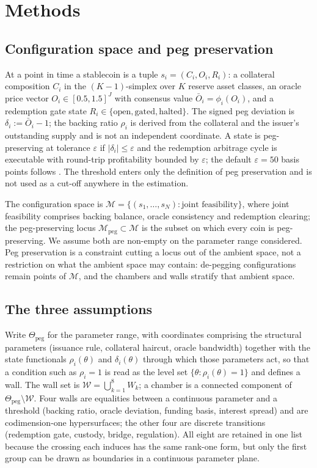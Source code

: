 \section*{Methods}

\subsection*{Configuration space and peg preservation}
At a point in time a stablecoin is a tuple $s_i=(C_i,O_i,R_i)$: a collateral composition $C_i$ in the $(K-1)$-simplex over $K$ reserve asset classes, an oracle price vector $O_i\in[0.5,1.5]^J$ with consensus value $\bar O_i=\phi_i(O_i)$, and a redemption gate state $R_i\in\{\text{open},\text{gated},\text{halted}\}$. The signed peg deviation is $\delta_i:=\bar O_i-1$; the backing ratio $\rho_i$ is derived from the collateral and the issuer's outstanding supply and is not an independent coordinate. A state is peg-preserving at tolerance $\varepsilon$ if $|\delta_i|\le\varepsilon$ and the redemption arbitrage cycle is executable with round-trip profitability bounded by $\varepsilon$; the default $\varepsilon=50$ basis points follows \citep{LyonsViswanath2023}. The threshold enters only the definition of peg preservation and is not used as a cut-off anywhere in the estimation.

The configuration space is $\mathcal{M}=\{(s_1,\dots,s_N):\text{joint feasibility}\}$, where joint feasibility comprises backing balance, oracle consistency and redemption clearing; the peg-preserving locus $\mathcal{M}_{\mathrm{peg}}\subset\mathcal{M}$ is the subset on which every coin is peg-preserving. We assume both are non-empty on the parameter range considered. Peg preservation is a constraint cutting a locus out of the ambient space, not a restriction on what the ambient space may contain: de-pegging configurations remain points of $\mathcal{M}$, and the chambers and walls stratify that ambient space.

\subsection*{The three assumptions}
Write $\Theta_{\mathrm{peg}}$ for the parameter range, with coordinates comprising the structural parameters (issuance rule, collateral haircut, oracle bandwidth) together with the state functionals $\rho_i(\theta)$ and $\delta_i(\theta)$ through which those parameters act, so that a condition such as $\rho_i=1$ is read as the level set $\{\theta:\rho_i(\theta)=1\}$ and defines a wall. The wall set is $\mathcal{W}=\bigcup_{k=1}^{8}W_k$; a chamber is a connected component of $\Theta_{\mathrm{peg}}\setminus\mathcal{W}$. Four walls are equalities between a continuous parameter and a threshold (backing ratio, oracle deviation, funding basis, interest spread) and are codimension-one hypersurfaces; the other four are discrete transitions (redemption gate, custody, bridge, regulation). All eight are retained in one list because the crossing each induces has the same rank-one form, but only the first group can be drawn as boundaries in a continuous parameter plane.

